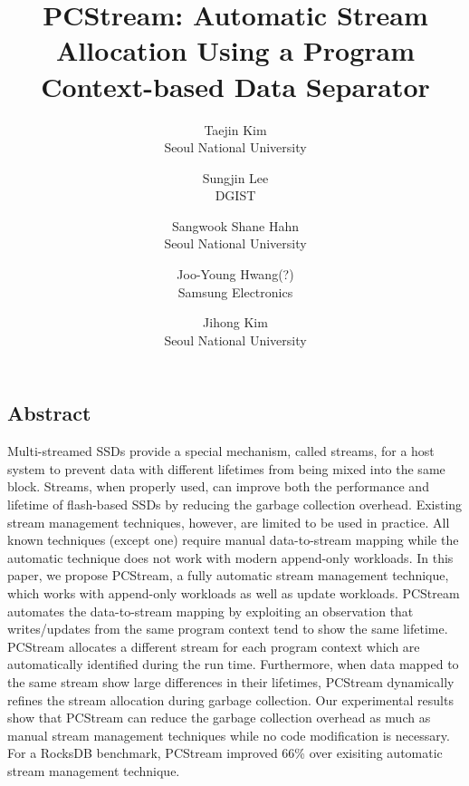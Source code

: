\documentclass[letterpaper, onecolumn, 10pt]{article}
\begin{document}
\title{
\bf PCStream: Automatic Stream Allocation Using a Program Context-based Data Separator
}


\author{
{\rm Taejin Kim}\\
Seoul National University
\and 
{\rm Sungjin Lee}\\
DGIST
\and 
{\rm Sangwook Shane Hahn}\\
Seoul National University
\and 
{\rm Joo-Young Hwang(?)} \\
Samsung Electronics
\and 
{\rm Jihong Kim} \\
Seoul National University
}

\maketitle

\thispagestyle{empty}

\subsection*{Abstract}
Multi-streamed SSDs provide a special mechanism, called streams,
for a host system to prevent data with different lifetimes from being
mixed into the same block. 
Streams, when properly used, can
improve both the performance and lifetime of flash-based SSDs by
reducing the garbage collection overhead. 
Existing stream
management techniques, however, are limited to be used in
practice. 
All known techniques (except one) require manual data-to-stream 
mapping while the automatic technique does not work with
modern append-only workloads. 
In this paper, we propose
PCStream, a fully automatic stream management technique, which
works with append-only workloads as well as update workloads.
PCStream automates the data-to-stream mapping by exploiting an
observation that writes/updates from the same program context
tend to show the same lifetime. 
PCStream allocates a different
stream for each program context which are automatically identified
during the run time. 
Furthermore, when data mapped to the same
stream show large differences in their lifetimes, PCStream
dynamically refines the stream allocation during garbage collection.
Our experimental results show that PCStream can reduce the
garbage collection overhead as much as manual stream
management techniques while no code modification is necessary.
For a RocksDB benchmark, PCStream improved 66\% over 
exisiting automatic stream management technique.








\end{document}
